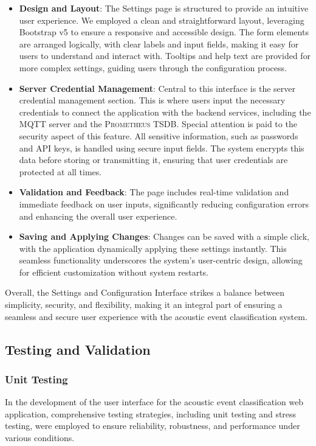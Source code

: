 \begin{itemize}
  \item \textbf{Design and Layout}: The Settings page is structured to provide an intuitive user experience. We employed a clean and straightforward layout, leveraging Bootstrap v5 to ensure a responsive and accessible design. The form elements are arranged logically, with clear labels and input fields, making it easy for users to understand and interact with. Tooltips and help text are provided for more complex settings, guiding users through the configuration process.
  \item \textbf{Server Credential Management}: Central to this interface is the server credential management section. This is where users input the necessary credentials to connect the application with the backend services, including the MQTT server and the \textsc{Prometheus} TSDB. Special attention is paid to the security aspect of this feature. All sensitive information, such as passwords and API keys, is handled using secure input fields. The system encrypts this data before storing or transmitting it, ensuring that user credentials are protected at all times.
  \item \textbf{Validation and Feedback}: The page includes real-time validation and immediate feedback on user inputs, significantly reducing configuration errors and enhancing the overall user experience.
  \item \textbf{Saving and Applying Changes}: Changes can be saved with a simple click, with the application dynamically applying these settings instantly. This seamless functionality underscores the system's user-centric design, allowing for efficient customization without system restarts.
\end{itemize}

Overall, the Settings and Configuration Interface strikes a balance between simplicity, security, and flexibility, making it an integral part of ensuring a seamless and secure user experience with the acoustic event classification system.


\subsection{Testing and Validation}
\subsubsection{Unit Testing}
In the development of the user interface for the acoustic event classification web application, comprehensive testing strategies, including unit testing and stress testing, were employed to ensure reliability, robustness, and performance under various conditions.

